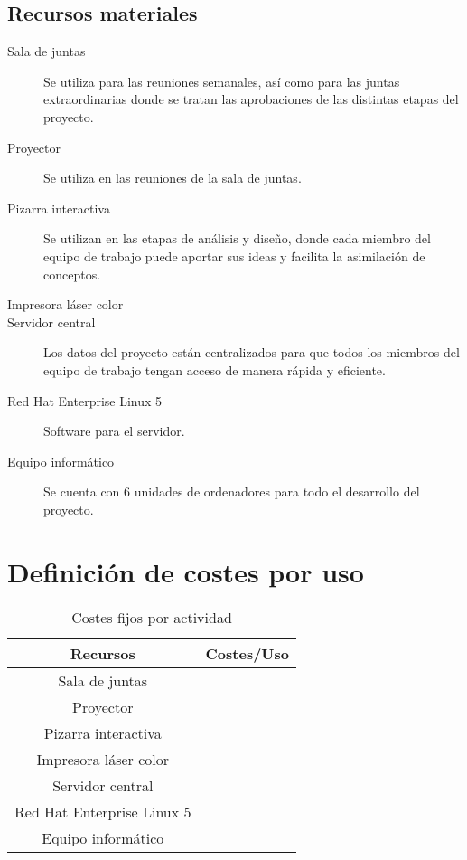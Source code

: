 \documentclass[11pt,a4paper,spanish,twoside]{book}
\begin{document}
\subsection{Recursos materiales}
\begin{description}
\item[Sala de juntas] Se utiliza para las reuniones semanales, así como para 
las juntas extraordinarias donde se tratan las aprobaciones de las distintas 
etapas del proyecto.
\item[Proyector] Se utiliza en las reuniones de la sala de juntas.
\item[Pizarra interactiva] Se utilizan en las etapas de análisis y diseño, 
donde cada miembro del equipo de trabajo puede aportar sus ideas y facilita la 
asimilación de conceptos.
\item[Impresora láser color]
\item[Servidor central] Los datos del proyecto están centralizados para que 
todos los miembros del equipo de trabajo tengan acceso de manera rápida y 
eficiente.
\item[Red Hat Enterprise Linux 5] Software para el servidor.
\item[Equipo informático] Se cuenta con 6 unidades de ordenadores para todo el 
desarrollo del proyecto.  
\end{description}

\section{Definición de costes por uso}

\begin{table}[!h]
\centering
  \begin{tabular}{|c|c|}
    \hline
    \textbf{Recursos} & \textbf{Costes/Uso} \\
    \hline \hline
    Sala de juntas & \\
    \hline
    Proyector & \\
    \hline
    Pizarra interactiva & \\
    \hline
    Impresora láser color & \\
    \hline
    Servidor central & \\
    \hline
    Red Hat Enterprise Linux 5 & \\
    \hline
    Equipo informático & \\
    \hline

  \end{tabular}
  \caption{Costes fijos por actividad}
  \label{Tab:costefijo}
\end{table}
\end{document}
